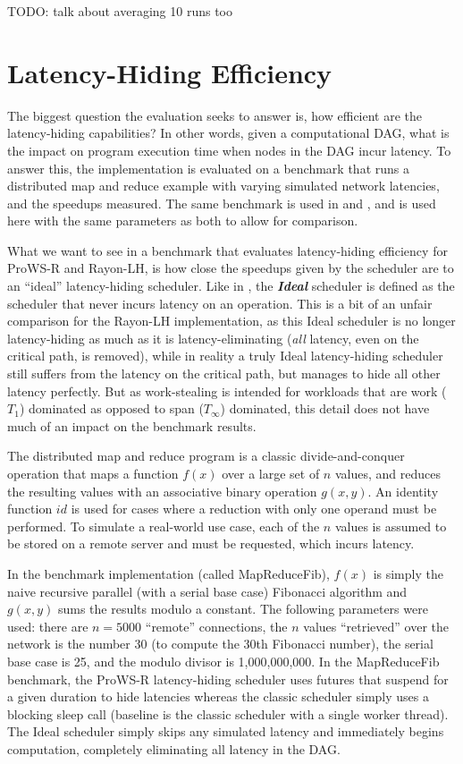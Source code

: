 \documentclass[bsc,frontabs,singlespacing,parskip,deptreport,normalheadings]{infthesis}
\begin{document}
TODO: talk about averaging 10 runs too 

\section{Latency-Hiding Efficiency}
\label{section:latency-hiding_efficiency}

The biggest question the evaluation seeks to answer is, how efficient are the
latency-hiding capabilities? In other words, given a computational DAG, what is
the impact on program execution time when nodes in the DAG incur latency. To
answer this, the implementation is evaluated on a benchmark that runs a
distributed map and reduce example with varying simulated network latencies, and the
speedups measured. The same benchmark is used in
\cite{muller_latency-hiding_2016} and \cite{singer_scheduling_2019}, and is used
here with the same parameters as both to allow for comparison.

What we want to see in a benchmark that evaluates latency-hiding efficiency for
ProWS-R and Rayon-LH, is how close the speedups given by the scheduler are to an
``ideal'' latency-hiding scheduler. Like in \cite{singer_scheduling_2019}, the
\textit{\textbf{Ideal}} scheduler is defined as the scheduler that never incurs
latency on an operation. This is a bit of an unfair comparison for the Rayon-LH
implementation, as this Ideal scheduler is no longer latency-hiding as much as
it is latency-eliminating (\textit{all} latency, even on the critical path, is
removed), while in reality a truly Ideal latency-hiding scheduler still suffers
from the latency on the critical path, but manages to hide all other latency
perfectly. But as work-stealing is intended for workloads that are work
(\(T_1\)) dominated as opposed to span (\(T_\infty\)) dominated, this detail
does not have much of an impact on the benchmark results.

The distributed map and reduce program is a classic divide-and-conquer operation
that maps a function \(f(x)\) over a large set of \(n\) values, and reduces the
resulting values with an associative binary operation \(g(x,y)\). An identity
function \(id\) is used for cases where a reduction with only one operand must
be performed. To simulate a real-world use case, each of the \(n\) values is
assumed to be stored on a remote server and must be requested, which incurs
latency.

In the benchmark implementation (called MapReduceFib), \(f(x)\) is simply the
naive recursive parallel (with a serial base case) Fibonacci algorithm and
\(g(x,y)\) sums the results modulo a constant. The following parameters were
used: there are \(n = 5000\) ``remote'' connections, the \(n\) values
``retrieved'' over the network is the number 30 (to compute the 30th Fibonacci
number), the serial base case is 25, and the modulo divisor is 1,000,000,000. In
the MapReduceFib benchmark, the ProWS-R latency-hiding scheduler uses futures
that suspend for a given duration to hide latencies whereas the classic
scheduler simply uses a blocking sleep call (baseline is the classic scheduler
with a single worker thread). The Ideal scheduler simply skips any simulated
latency and immediately begins computation, completely eliminating all latency
in the DAG.
\end{document}
